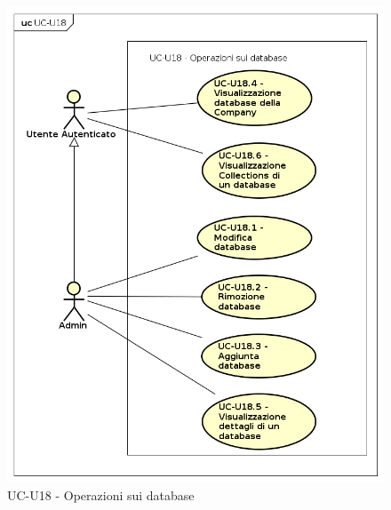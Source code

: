     \begin{figure}[H]
      \begin{center}
        \includegraphics[width=12cm]{res/img/UCUtenti/UCUtenteA/UC-U18-OperazioniDatabase/UC-U18-OperazioniDatabase.png}
      \caption{UC-U18 - Operazioni sui database}
      \end{center} 
    \end{figure}    
    
